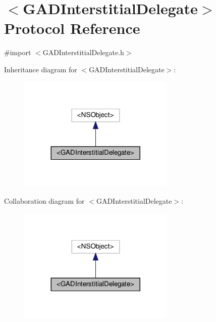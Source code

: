\hypertarget{protocolGADInterstitialDelegate-p}{}\section{$<$G\+A\+D\+Interstitial\+Delegate$>$ Protocol Reference}
\label{protocolGADInterstitialDelegate-p}


{\ttfamily \#import $<$G\+A\+D\+Interstitial\+Delegate.\+h$>$}



Inheritance diagram for $<$G\+A\+D\+Interstitial\+Delegate$>$\+:
\nopagebreak
\begin{figure}[H]
\begin{center}
\leavevmode
\includegraphics[width=212pt]{protocolGADInterstitialDelegate-p__inherit__graph}
\end{center}
\end{figure}


Collaboration diagram for $<$G\+A\+D\+Interstitial\+Delegate$>$\+:
\nopagebreak
\begin{figure}[H]
\begin{center}
\leavevmode
\includegraphics[width=212pt]{protocolGADInterstitialDelegate-p__coll__graph}
\end{center}
\end{figure}
